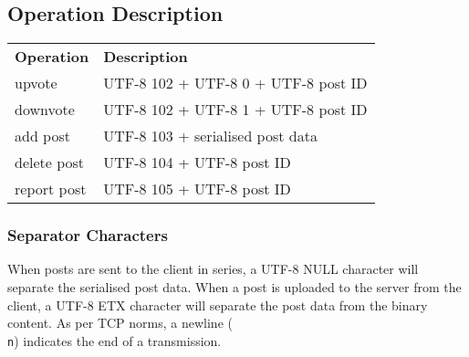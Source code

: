 \documentclass[12pt, a4paper]{article}
\begin{document}
\subsection{Operation Description}
\begin{table}[h]
\centering
\label{my-label}
\begin{tabular}{ll}
\textbf{Operation} &\textbf{Description}\\
upvote & UTF-8 102 + UTF-8 0 + UTF-8 post ID\\
downvote & UTF-8 102 + UTF-8 1 + UTF-8 post ID\\
add post & UTF-8 103 + serialised post data\\
delete post & UTF-8 104 + UTF-8 post ID\\
report post & UTF-8 105 + UTF-8 post ID\\
\end{tabular}
\end{table}

\subsubsection{Separator Characters}
When posts are sent to the client in series, a UTF-8 NULL character will separate the serialised post data. When a post is uploaded to the server from the client, a UTF-8 ETX character will separate the post data from the binary content. As per TCP norms, a newline (\texttt{\\n}) indicates the end of a transmission.

\clearpage
\end{document}
